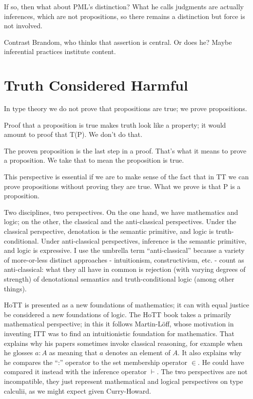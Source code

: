 \documentclass{article}
\begin{document}
If so, then what about PML's distinction?  What he calls judgments are
actually inferences, which are not propositions, so there remains a
distinction but force is not involved.

Contrast Brandom, who thinks that assertion is central.  Or does he?
Maybe inferential practices institute content.

\section{Truth Considered Harmful}

In type theory we do not prove that propositions are true; we prove propositions.

Proof that a proposition is true makes truth look like a property; it
would amount to proof that T(P).  We don't do that.

The proven proposition is the last step in a proof.  That's what it
means to prove a proposition.  We take that to mean the proposition is true.

This perspective is essential if we are to make sense of the fact that
in TT we can prove propositions without proving they are true.  What
we prove is that P is a proposition.

Two disciplines, two perspectives.  On the one hand, we have
mathematics and logic; on the other, the classical and the
anti-classical perspectives.  Under the classical perspective,
denotation is the semantic primitive, and logic is truth-conditional.
Under anti-classical perspectives, inference is the semantic
primitive, and logic is expressive.  I use the umbrella term
``anti-classical'' because a variety of more-or-less distinct
approaches - intuitionism, constructivism, etc. - count as
anti-classical: what they all have in common is rejection (with
varying degrees of strength) of denotational semantics and
truth-conditional logic (among other things).

HoTT is presented as a new foundations of mathematics; it can with
equal justice be considered a new foundations of logic.  The HoTT book
takes a primarily mathematical perspective; in this it follows
Martin-Löff, whose motivation in inventing ITT was to find an
intuitionistic foundation for mathematics.  That explains why his
papers sometimes invoke classical reasoning, for example when he
glosses \(a{:}A\) as meaning that \(a\) denotes an element of \(A\).  It
also explains why he compares the ``:'' operator to the set membership
operator \(\in\).  He could have compared it instead with the
inference operator \(\vdash\).  The two perspectives are not
incompatible, they just represent mathematical and logical
perspectives on type calculii, as we might expect given Curry-Howard.
\end{document}
